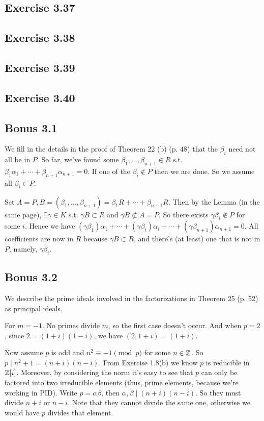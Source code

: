 \documentclass[../Marcus.tex]{subfiles}
\begin{document}
\subsection*{Exercise 3.37}

\subsection*{Exercise 3.38}

\subsection*{Exercise 3.39}

\subsection*{Exercise 3.40}

\subsection*{Bonus 3.1}

We fill in the details in the proof of Theorem 22 (b) (p. 48) that the $\beta_i$ need not all be in $P$. So far, we've found some $\beta_1,\ldots,\beta_{n+1}\in R$ s.t. $\beta_1\alpha_1+\cdots+\beta_{n+1}\alpha_{n+1}=0$. If one of the $\beta_i\notin P$ then we are done. So we assume all $\beta_i\in P$. 

Set $A=P,B=(\beta_1,\ldots,\beta_{n+1})=\beta_1R+\cdots+\beta_{n+1}R$. Then by the Lemma (in the same page), $\exists \gamma\in K$ s.t. $\gamma B\subset R$ and $\gamma B\not\subset A=P$. So there exists $\gamma\beta_i\notin P$ for some $i$. Hence we have $(\gamma\beta_1)\alpha_1+\cdots+(\gamma\beta_i)\alpha_i+\cdots+(\gamma\beta_{n+1})\alpha_{n+1}=0$. All coefficients are now in $R$ because $\gamma B\subset R$, and there's (at least) one that is not in $P$, namely, $\gamma\beta_i$.

\subsection*{Bonus 3.2}

We describe the prime ideals involved in the factorizations in Theorem 25 (p. 52) as principal ideals.

For $m=-1$. No primes divide $m$, so the first case doesn't occur. And when $p=2$, since $2=(1+i)(1-i)$, we have $(2,1+i)=(1+i)$.

Now assume $p$ is odd and $n^2\equiv -1 \pmod{p}$ for some $n\in\mathbb{Z}$. So $p\mid n^2+1=(n+i)(n-i)$. From Exercise 1.8(b) we know $p$ is reducible in $\mathbb{Z}[i]$. Moreover, by considering the norm it's easy to see that $p$ can only be factored into two irreducible elements (thus, prime elements, because we're working in PID). Write $p=\alpha\beta$, then $\alpha,\beta\mid(n+i)(n-i)$. So they must divide $n+i$ or $n-i$. Note that they cannot divide the same one, otherwise we would have $p$ divides that element.
\end{document}

